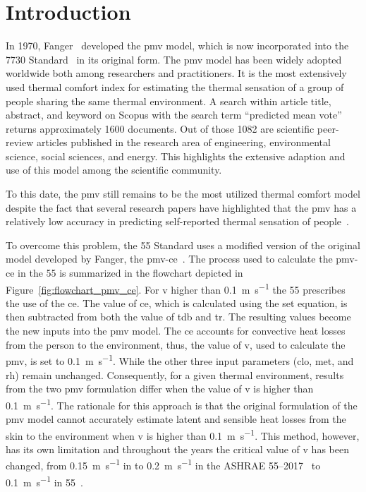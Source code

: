 \section{Introduction}\label{sec:introduction}

In 1970, Fanger~\cite{Fanger1970} developed the \ac{pmv} model, which is now incorporated into the \gls{7730} Standard~\cite{iso7730} in its original form.
The \ac{pmv} model has been widely adopted worldwide both among researchers and practitioners.
It is the most extensively used thermal comfort index for estimating the thermal sensation of a group of people sharing the same thermal environment.
A search within article title, abstract, and keyword on Scopus with the search term ``predicted mean vote'' returns approximately 1600 documents.
Out of those 1082 are scientific peer-review articles published in the research area of engineering, environmental science, social sciences, and energy.
This highlights the extensive adaption and use of this model among the scientific community.

To this date, the \ac{pmv} still remains to be the most utilized thermal comfort model despite the fact that several research papers have highlighted that the \ac{pmv} has a relatively low accuracy in predicting self-reported thermal sensation of people~\cite{Cheung2019}.  %

To overcome this problem, the \gls{55} Standard uses a modified version of the original model developed by Fanger, the \gls{pmv-ce}~\cite{ashrae552020}.
The process used to calculate the \gls{pmv-ce} in the \gls{55} is summarized in the flowchart depicted in Figure~\ref{fig:flowchart_pmv_ce}.
For \ac{v} higher than \qty{0.1}{\m\per\s} the \gls{55} prescribes the use of the \ac{ce}.
The value of \ac{ce}, which is calculated using the \ac{set} equation, is then subtracted from both the value of \ac{tdb} and \ac{tr}.
The resulting values become the new inputs into the \ac{pmv} model.
The \ac{ce} accounts for convective heat losses from the person to the environment, thus, the value of \ac{v}, used to calculate the \ac{pmv}, is set to \qty{0.1}{\m\per\s}.
While the other three input parameters (\ac{clo}, \ac{met}, and \ac{rh}) remain unchanged.
Consequently, for a given thermal environment, results from the two \ac{pmv} formulation differ when the value of \ac{v} is higher than \qty{0.1}{\m\per\s}.
The rationale for this approach is that the original formulation of the \ac{pmv} model cannot accurately estimate latent and sensible heat losses from the skin to the environment when \ac{v} is higher than \qty{0.1}{\m\per\s}.
This method, however, has its own limitation and throughout the years the critical value of \ac{v} has been changed, from \qty{0.15}{\m\per\s} in  to \qty{0.2}{\m\per\s} in the ASHRAE 55--2017~\cite{ASHRAE552017} to \qty{0.1}{\m\per\s} in \gls{55}~\cite{ashrae552020}.

